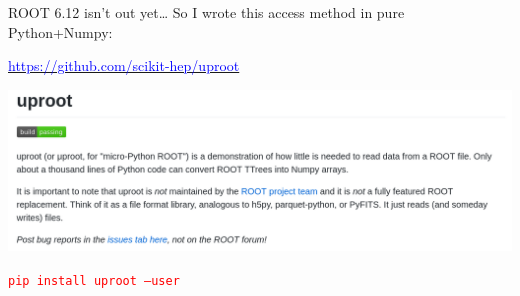 \documentclass[aspectratio=169]{beamer}
\begin{document}
\begin{frame}{ROOT 6.12 isn't out yet\ldots}
\vspace{0.5 cm}
So I wrote this access method in pure Python+Numpy:

\begin{center}
\href{https://github.com/scikit-hep/uproot}{\textcolor{blue}{\Large https://github.com/scikit-hep/uproot}}
\end{center}

\includegraphics[width=\linewidth]{uproot.png}

\begin{center}
\Large \textcolor{red}{\tt pip install uproot --user}
\end{center}
\end{frame}
\end{document}
